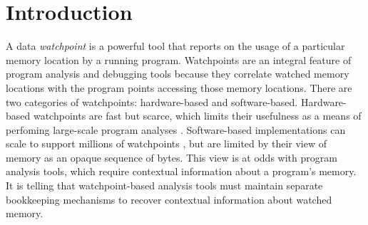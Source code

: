 \documentclass[letterpaper,twocolumn,10pt]{article}
\begin{document}
\section{Introduction}

A data \emph{watchpoint} is a powerful tool that reports on the usage of a particular memory location by a running program. Watchpoints are an integral feature of program analysis and debugging tools because they correlate watched memory locations with the program points accessing those memory locations. There are two categories of watchpoints: hardware-based and software-based. Hardware-based watchpoints are fast but scarce, which limits their usefulness as a means of perfoming large-scale program analyses \cite{UnlimitedWatchpoints}. Software-based implementations can scale to support millions of watchpoints \cite{DynamoRIOWatchpoints}, but are limited by their view of memory as an opaque sequence of bytes. This view is at odds with program analysis tools, which require contextual information about a program's memory. It is telling that watchpoint-based analysis tools must maintain separate bookkeeping mechanisms to recover contextual information about watched memory.

\end{document}
